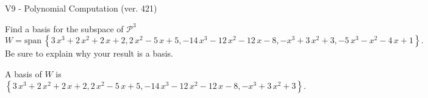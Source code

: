 \begin{exercise}
  \begin{exerciseTitle}V9 - Polynomial Computation (ver. 421)\end{exerciseTitle}
  \begin{exerciseStatement}
    Find a basis for the subspace of \(\mathcal{P}^3\) 
\[W=\mathrm{span}\ \left\{3 \, x^{3} + 2 \, x^{2} + 2 \, x + 2 , 2 \, x^{2} - 5 \, x + 5 , -14 \, x^{3} - 12 \, x^{2} - 12 \, x - 8 , -x^{3} + 3 \, x^{2} + 3 , -5 \, x^{3} - x^{2} - 4 \, x + 1\right\}.\]
 Be sure to explain why your result is a basis.


  \end{exerciseStatement}
  \begin{exerciseAnswer}
   A basis of \(W\) is  \(\left\{3 \, x^{3} + 2 \, x^{2} + 2 \, x + 2 , 2 \, x^{2} - 5 \, x + 5 , -14 \, x^{3} - 12 \, x^{2} - 12 \, x - 8 , -x^{3} + 3 \, x^{2} + 3\right\}\).
  


  \end{exerciseAnswer}
\end{exercise}